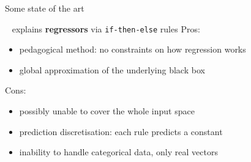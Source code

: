 \documentclass[presentation]{beamer}
\begin{document}
\begin{frame}[allowframebreaks]{Some state of the art}
	\framebreak

	\begin{block}{\iter~ explains \textbf{regressors} via \texttt{if-then-else} rules}
		Pros:
		\begin{itemize}
			\item pedagogical method: no constraints on how regression works
			\item global approximation of the underlying black box 
		\end{itemize}

		Cons:
		\begin{itemize}
			\item possibly unable to cover the whole input space
			\item prediction discretisation: each rule predicts a constant
			\item inability to handle categorical data, only real vectors
		\end{itemize}
	\end{block}


%

\end{frame}
\end{document}
